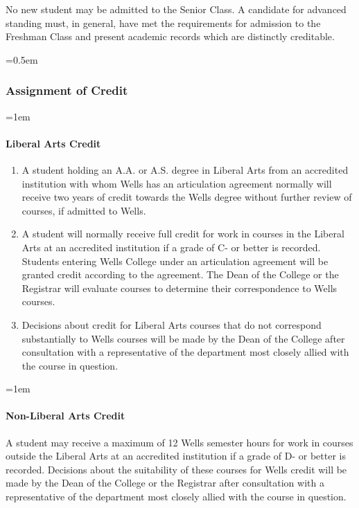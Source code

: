 \documentclass{manual}
\newcommand{\modified}[1]{}
\let\oldsubsubsection\subsubsection
\renewcommand\subsubsection{\leftskip=0.5em\oldsubsubsection}
\let\oldparagraph\paragraph
\renewcommand\paragraph{\leftskip=1em\oldparagraph}
\newcommand{\itemLevelA}{\alph*.}
\newcommand{\itemRefA}{\alph*}
\begin{document}
No new student may be admitted to the Senior Class. A candidate for advanced standing must, in general, have met the requirements for admission to the Freshman Class and present academic records which are distinctly creditable.

\subsubsection{Assignment of Credit}\label{sub:AssignmentOfCredit}

\paragraph{Liberal Arts Credit}

\begin{enumerate}[label=\itemLevelA,ref=\itemRefA]
\item A student holding an A.A. or A.S. degree in Liberal Arts from an accredited institution with whom Wells has an articulation agreement normally will receive two years of credit towards the Wells degree without further review of  courses, if  admitted to Wells.

\item A student will normally receive full credit for work in courses in the Liberal Arts \modified{9/14/99} at an accredited institution if a grade of C- or better is recorded. Students entering Wells College under an articulation agreement will be granted credit according to the agreement. The Dean of  the College or the Registrar will evaluate courses to determine their correspondence to Wells courses.

\item Decisions about credit for Liberal Arts courses that do not correspond substantially to Wells courses will be made by the Dean of the College after consultation with a representative of the department most closely allied with the course in question.
\end{enumerate}

\paragraph{Non-Liberal Arts Credit}
A student may receive a maximum of 12 Wells semester hours for work in courses outside the Liberal Arts at an accredited institution if a grade of D- or better is recorded. Decisions about the suitability of these courses for Wells credit will be made by the Dean of the College or the Registrar after consultation with a representative of the department most closely allied with the course in question.
\end{document}
